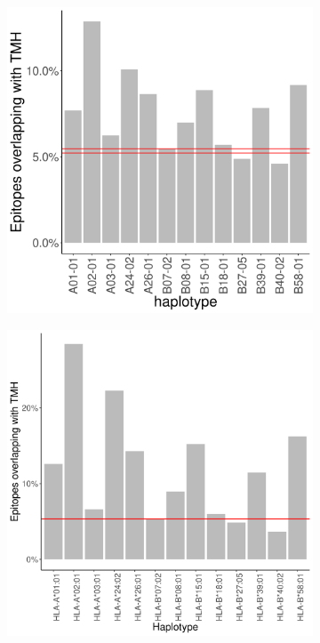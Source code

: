 \begin{figure}
  \centering
  \begin{subfigure}[t]{0.45\textwidth}
    \centering
    \caption{}
    \includegraphics[width=\linewidth]{bianchi_et_al_2017_results/figure-1-a.png} %
    \label{fig:bianch_et_al_2017_1a}
  \end{subfigure}
  \hfill
  \begin{subfigure}[t]{0.45\textwidth}
    \centering
    \caption{}
    \includegraphics[width=\linewidth]{bbbq_1_smart_results/fig_f_tmh_2_human_mhc1.png}
    \label{fig:bilderbeek_et_al_2021_1a}
  \end{subfigure}


\end{figure}
